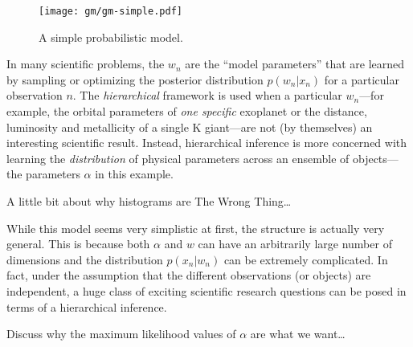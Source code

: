 \documentclass[12pt,preprint]{aastex}
\newcommand{\figlabel}[1]{\label{fig:#1}}
\newcommand{\pr}[1]{p ( #1 )}
\begin{document}
\begin{figure}[htbp]
    \begin{center}
        \texttt{[image: gm/gm-simple.pdf]}
    \end{center}
    \caption{A simple probabilistic model.\figlabel{gm-simple}}
\end{figure}

In many scientific problems, the $w_n$ are the ``model parameters'' that are
learned by sampling or optimizing the posterior distribution $\pr{w_n | x_n}$
for a particular observation $n$. The \emph{hierarchical} framework
is used when a particular $w_n$---for example, the orbital parameters of
\emph{one specific} exoplanet or the distance, luminosity and metallicity of
a single K giant---are not (by themselves) an interesting scientific result.
Instead, hierarchical inference is more concerned with learning the
\emph{distribution} of physical parameters across an ensemble of
objects---the parameters $\alpha$ in this example.

A little bit about why histograms are The Wrong Thing\ldots

While this model seems very simplistic at first, the structure is actually
very general. This is because both $\alpha$ and $w$ can have an arbitrarily
large number of dimensions and the distribution $\pr{x_n | w_n}$ can be
extremely complicated. In fact, under the assumption that the different
observations (or objects) are independent, a huge class of exciting
scientific research questions can be posed in terms of a hierarchical
inference.

Discuss why the maximum likelihood values of $\alpha$ are what we want\ldots
\end{document}
